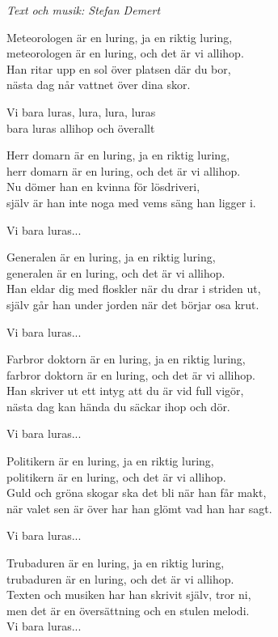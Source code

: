 {\footnotesize\textit{Text och musik: Stefan Demert}}\par
\vspace{10pt}
Meteorologen är en luring, ja en riktig luring,\\
meteorologen är en luring, och det är vi allihop.\\
Han ritar upp en sol över platsen där du bor,\\
nästa dag når vattnet över dina skor.\par
\vspace{10pt}
Vi bara luras, lura, lura, luras\\
bara luras allihop och överallt\par
\vspace{10pt}
Herr domarn är en luring, ja en riktig luring,\\
herr domarn är en luring, och det är vi allihop.\\
Nu dömer han en kvinna för lösdriveri,\\
själv är han inte noga med vems säng han ligger i.\par
\vspace{10pt}
Vi bara luras...\par
\vspace{10pt}
Generalen är en luring, ja en riktig luring,\\
generalen är en luring, och det är vi allihop.\\
Han eldar dig med floskler när du drar i striden ut,\\
själv går han under jorden när det börjar osa krut.\par
\vspace{10pt}
Vi bara luras...\par
\vspace{10pt}
Farbror doktorn är en luring, ja en riktig luring,\\
farbror doktorn är en luring, och det är vi allihop.\\
Han skriver ut ett intyg att du är vid full vigör,\\
nästa dag kan hända du säckar ihop och dör.\par
\vspace{10pt}
Vi bara luras...\par
\vspace{10pt}
Politikern är en luring, ja en riktig luring,\\
politikern är en luring, och det är vi allihop.\\
Guld och gröna skogar ska det bli när han får makt,\\
när valet sen är över har han glömt vad han har sagt.\par
\vspace{10pt}
Vi bara luras...\par
\vspace{10pt}
Trubaduren är en luring, ja en riktig luring,\\
trubaduren är en luring, och det är vi allihop.\\
Texten och musiken har han skrivit själv, tror ni,\\
men det är en översättning och en stulen melodi.\\
Vi bara luras...
